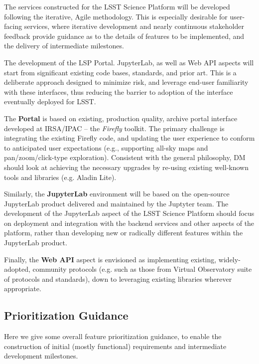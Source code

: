 \documentclass[DM,lsstdraft,toc]{lsstdoc}
\begin{document}
The services constructed for the LSST Science Platform will be developed following the iterative, Agile methodology. This is especially desirable for user-facing services, where iterative development and nearly continuous stakeholder feedback provide guidance as to the details of features to be implemented, and the delivery of intermediate milestones.

The development of the LSP Portal. JupyterLab, as well as Web API aspects will start from significant existing code bases, standards, and prior art. This is a deliberate approach designed to minimize risk, and leverage end-user familiarity with these interfaces, thus reducing the barrier to adoption of the interface eventually deployed for LSST.

The {\bf Portal} is based on existing, production quality, archive portal interface developed at IRSA/IPAC -- the {\em Firefly} toolkit. The primary challenge is integrating the existing Firefly code, and updating the user experience to conform to anticipated user expectations (e.g., supporting all-sky maps and pan/zoom/click-type exploration). Consistent with the general philosophy, DM should look at achieving the necessary upgrades by re-using existing well-known tools and libraries (e.g. Aladin Lite).

Similarly, the {\bf JupyterLab} environment will be based on the open-source JupyterLab product delivered and maintained by the Juptyter team. The development of the JupyterLab aspect of the LSST Science Platform should focus on deployment and integration with the backend services and other aspects of the platform, rather than developing new or radically different features within the JupyterLab product.

Finally, the {\bf Web API} aspect is envisioned as implementing existing, widely-adopted, community protocols (e.g. such as those from Virtual Observatory suite of protocols and standards), down to leveraging existing libraries wherever appropriate.

\subsection{Prioritization Guidance}

Here we give some overall feature prioritization guidance, to enable the construction of initial (mostly functional) requirements and intermediate development milestones.
\end{document}
